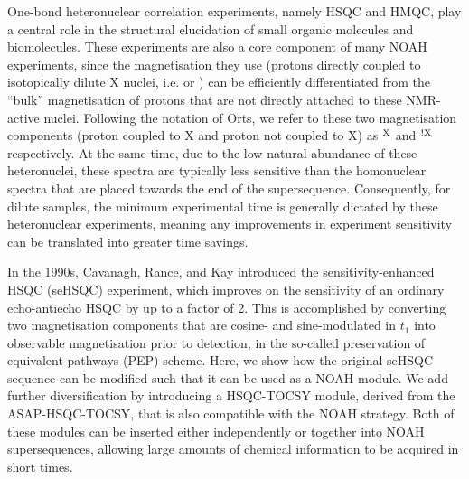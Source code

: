 \documentclass[11pt]{article}
\newcommand*{\carbon}{\ce{^{13}C}}
\newcommand*{\nitrogen}{\ce{^{15}N}}
\newcommand*{\magn}[1]{\ce{^1H}$^{#1}$}
\newcommand*{\magnnot}[1]{\ce{^1H}$^{!#1}$}
\begin{document}
One-bond heteronuclear correlation experiments, namely HSQC and HMQC, play a central role in the structural elucidation of small organic molecules and biomolecules.\autocite{textbooks}
These experiments are also a core component of many NOAH experiments, since the magnetisation they use (protons directly coupled to isotopically dilute X nuclei, i.e. \carbon{} or \nitrogen{}) can be efficiently differentiated from the ``bulk'' magnetisation of protons that are not directly attached to these NMR-active nuclei.\autocite{Garbow1982CPL, Kupce2019JMR}
Following the notation of Orts,\autocite{Orts2018M} we refer to these two magnetisation components (proton coupled to X and proton not coupled to X) as \magn{\ce{X}} and \magnnot{\ce{X}} respectively.
At the same time, due to the low natural abundance of these heteronuclei, these spectra are typically less sensitive than the homonuclear spectra that are placed towards the end of the supersequence.
Consequently, for dilute samples, the minimum experimental time is generally dictated by these heteronuclear experiments, meaning any improvements in experiment sensitivity can be translated into greater time savings.

In the 1990s, Cavanagh, Rance, and Kay introduced the sensitivity-enhanced HSQC (seHSQC) experiment,\autocite{sehsqc} which improves on the sensitivity of an ordinary echo-antiecho HSQC by up to a factor of 2.
This is accomplished by converting two magnetisation components that are cosine- and sine-modulated in $t_1$ into observable magnetisation prior to detection, in the so-called preservation of equivalent pathways (PEP) scheme.
Here, we show how the original seHSQC sequence can be modified such that it can be used as a NOAH module.
We add further diversification by introducing a HSQC-TOCSY module, derived from the ASAP-HSQC-TOCSY,\autocite{Becker2019JMR} that is also compatible with the NOAH strategy.
Both of these modules can be inserted either independently or together into NOAH supersequences, allowing large amounts of chemical information to be acquired in short times.


\end{document}
